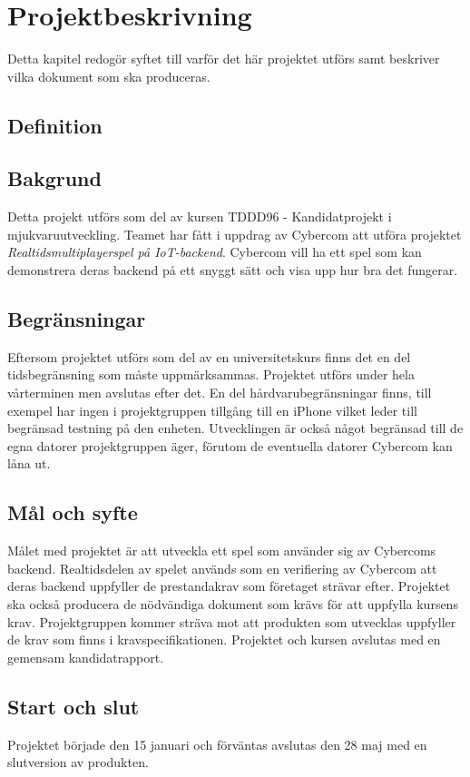 \section{Projektbeskrivning}

Detta kapitel redogör syftet till varför det här projektet utförs samt beskriver vilka dokument som ska produceras.

\subsection{Definition}
\begin{itemize}[leftmargin=5cm]
\end{itemize}


\subsection{Bakgrund}
Detta projekt utförs som del av kursen TDDD96 - Kandidatprojekt i mjukvaruutveckling. Teamet har fått i uppdrag av Cybercom att utföra projektet \textit{Realtidsmultiplayerspel på IoT-backend}. Cybercom vill ha ett spel som kan demonstrera deras backend på ett snyggt sätt och visa upp hur bra det fungerar.

\subsection{Begränsningar}
Eftersom projektet utförs som del av en universitetskurs finns det en del tidsbegränsning som måste uppmärksammas. Projektet utförs under hela vårterminen men avslutas efter det. En del hårdvarubegränsningar finns, till exempel har ingen i projektgruppen tillgång till en iPhone vilket leder till begränsad testning på den enheten. Utvecklingen är också något begränsad till de egna datorer projektgruppen äger, förutom de eventuella datorer Cybercom kan låna ut.

\subsection{Mål och syfte}
Målet med projektet är att utveckla ett spel som använder sig av Cybercoms backend. Realtidsdelen av spelet används som en verifiering av Cybercom att deras backend uppfyller de prestandakrav som företaget strävar efter. Projektet ska också producera de nödvändiga dokument som krävs för att uppfylla kursens krav\cite{bib-tddd96}. Projektgruppen kommer sträva mot att produkten som utvecklas uppfyller de krav som finns i kravspecifikationen\cite{bib-kravspec}. Projektet och kursen avslutas med en gemensam kandidatrapport.



\subsection{Start och slut}
Projektet började den 15 januari och förväntas avslutas den 28 maj med en slutversion av produkten.

\pagebreak
